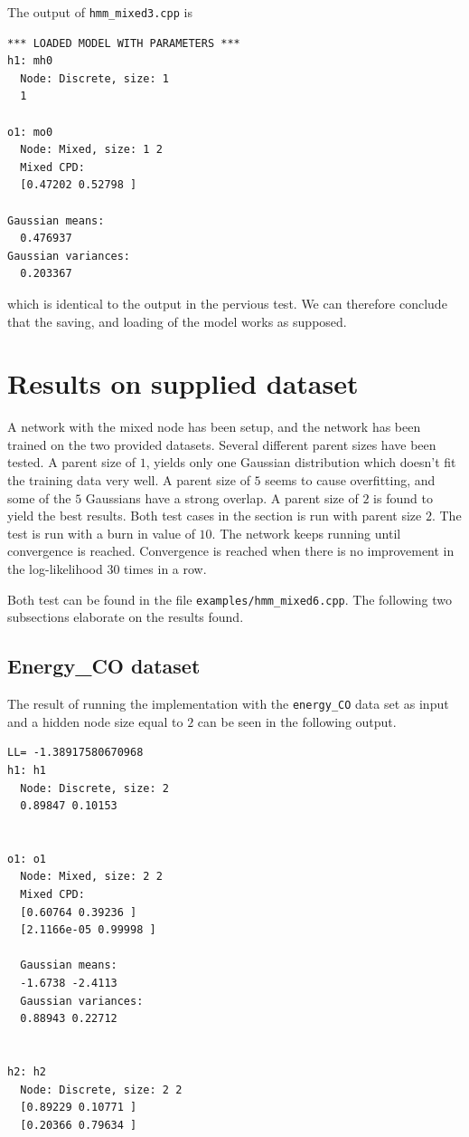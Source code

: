 \documentclass[10pt, journal, compsoc, a4paper]{IEEEtran}
\begin{document}
The output of \texttt{hmm\_mixed3.cpp} is 

\begin{verbatim}
*** LOADED MODEL WITH PARAMETERS ***
h1: mh0
  Node: Discrete, size: 1 
  1 

o1: mo0
  Node: Mixed, size: 1 2 
  Mixed CPD: 
  [0.47202 0.52798 ]

Gaussian means: 
  0.476937 
Gaussian variances: 
  0.203367   
\end{verbatim}
which is identical to the output in the pervious test. We can therefore conclude that the saving, and loading of the model works as supposed.




\section{Results on supplied dataset} %
\label{sec:results}
A network with the mixed node has been setup, and the network has been trained on the two provided datasets. Several different parent sizes have been tested. A parent size of $1$, yields only one Gaussian distribution which doesn't fit the training data very well. A parent size of $5$ seems to cause overfitting, and some of the $5$ Gaussians have a strong overlap. A parent size of $2$ is found to yield the best results. Both test cases in the section is run with parent size $2$. The test is run with a burn in value of $10$. The network keeps running until convergence is reached. Convergence is reached when there is no improvement in the log-likelihood 30 times in a row.

Both test can be found in the file \texttt{examples/hmm\_mixed6.cpp}. The following two subsections elaborate on the results found.

\subsection{Energy\_CO dataset} %
\label{sub:energy_co_dataset}

The result of running the implementation with the \texttt{energy\_CO} data set as input and a hidden node size equal to $2$ can be seen in the following output.

\begin{verbatim}
LL= -1.38917580670968
h1: h1
  Node: Discrete, size: 2 
  0.89847 0.10153 


o1: o1
  Node: Mixed, size: 2 2 
  Mixed CPD: 
  [0.60764 0.39236 ]
  [2.1166e-05 0.99998 ]

  Gaussian means: 
  -1.6738 -2.4113 
  Gaussian variances: 
  0.88943 0.22712 


h2: h2
  Node: Discrete, size: 2 2 
  [0.89229 0.10771 ]
  [0.20366 0.79634 ]
\end{verbatim}
\end{document}

